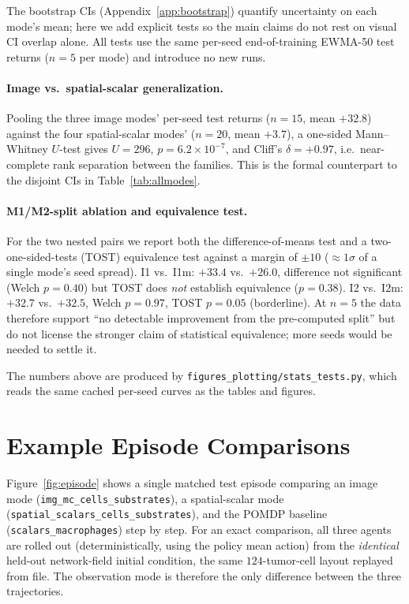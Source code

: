\documentclass{article}
\newcommand{\Itwo}{\texttt{img\_mc\_cells\_substrates}}
\newcommand{\Sone}{\texttt{scalars\_macrophages}}
\newcommand{\Sthree}{\texttt{spatial\_scalars\_cells\_substrates}}
\begin{document}
The bootstrap CIs (Appendix~\ref{app:bootstrap}) quantify uncertainty on each
mode's mean; here we add explicit tests so the main claims do not rest on visual
CI overlap alone. All tests use the same per-seed end-of-training EWMA-50 test
returns ($n=5$ per mode) and introduce no new runs.

\paragraph{Image vs.\ spatial-scalar generalization.}
Pooling the three image modes' per-seed test returns ($n=15$, mean $+32.8$)
against the four spatial-scalar modes' ($n=20$, mean $+3.7$), a one-sided
Mann--Whitney $U$-test gives $U=296$, $p=6.2\times10^{-7}$, and Cliff's
$\delta=+0.97$, i.e.\ near-complete rank separation between the families. This is the
formal counterpart to the disjoint CIs in Table~\ref{tab:allmodes}.

\paragraph{M1/M2-split ablation and equivalence test.}
For the two nested pairs we report both the difference-of-means test and a
two-one-sided-tests (TOST) equivalence test against a margin of $\pm10$
(${\approx}1\sigma$ of a single mode's seed spread). I1 vs.\ I1m:
$+33.4$ vs.\ $+26.0$, difference not significant (Welch $p=0.40$) but TOST does
\emph{not} establish equivalence ($p=0.38$). I2 vs.\ I2m: $+32.7$ vs.\ $+32.5$,
Welch $p=0.97$, TOST $p=0.05$ (borderline). At $n=5$ the data therefore support
``no detectable improvement from the pre-computed split'' but do not license the
stronger claim of statistical equivalence; more seeds would be needed to settle it.

The numbers above are produced by \texttt{figures\_plotting/stats\_tests.py},
which reads the same cached per-seed curves as the tables and figures.



\section{Example Episode Comparisons}
\label{app:episodes}

Figure~\ref{fig:episode} shows a single matched test episode comparing an image
mode (\Itwo{}), a spatial-scalar mode (\Sthree{}), and the POMDP baseline
(\Sone{}) step by step. For an exact comparison, all three agents are rolled
out (deterministically, using the policy mean action) from the
\emph{identical} held-out network-field initial condition, the same
$124$-tumor-cell layout replayed from file. The observation mode is therefore
the only difference between the three trajectories.
\end{document}

